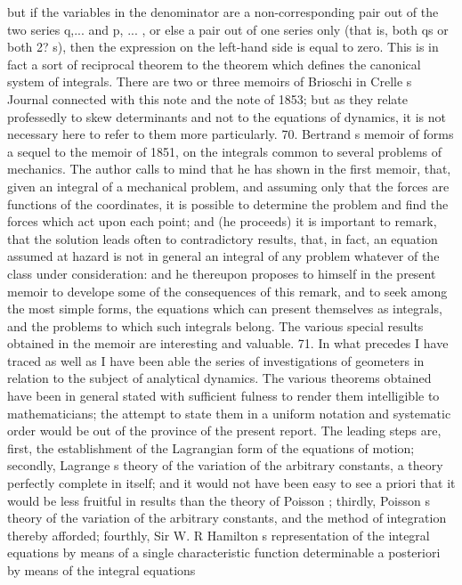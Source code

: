 \documentclass[11pt,a4paper]{book}
\begin{document}
but
if
the
variables
in
the
denominator
are
a
non-corresponding
pair
out
of
the two
series
q,... and
p,
...
,
or
else
a
pair
out
of one
series
only
(that
is,
both qs
or both
2? s), then
the
expression
on
the
left-hand
side
is
equal
to
zero.
This
is
in
fact a
sort
of
reciprocal theorem
to
the
theorem
which
defines
the
canonical
system
of
integrals.
There
are
two
or
three
memoirs
of
Brioschi
in
Crelle s
Journal
connected
with
this
note and
the
note
of
1853;
but
as
they
relate
professedly
to
skew
determinants
and
not
to
the
equations
of
dynamics,
it
is
not
necessary
here
to
refer
to
them
more
particularly.
70.
Bertrand s
memoir
of
forms
a
sequel
to
the
memoir
of
1851,
on
the
integrals common
to
several
problems
of
mechanics.
The
author
calls
to mind that he
has
shown
in
the
first
memoir,
that,
given
an
integral
of
a
mechanical
problem, and
assuming only that the
forces are
functions
of the
coordinates, it
is
possible
to determine
the
problem
and
find
the
forces which
act
upon
each
point;
and
(he
proceeds)
it
is
important
to
remark,
that
the
solution
leads
often
to
contradictory
results,
that,
in
fact,
an
equation
assumed
at
hazard
is
not
in
general
an
integral
of
any
problem
whatever
of
the
class
under
consideration:
and
he
thereupon
proposes
to
himself
in
the
present
memoir
to
develope
some
of
the
consequences
of
this
remark,
and
to
seek
among
the
most
simple
forms,
the
equations
which
can
present
themselves
as
integrals, and
the
problems to
which
such
integrals
belong.
The
various
special
results
obtained
in the memoir are interesting and valuable.
71.
In
what
precedes
I
have
traced
as
well
as
I
have
been
able
the
series
of
investigations
of
geometers
in
relation
to
the
subject
of
analytical
dynamics.
The
various theorems
obtained have
been
in
general
stated with
sufficient
fulness
to
render
them
intelligible
to mathematicians;
the attempt
to
state
them
in
a
uniform
notation
and
systematic
order would
be
out
of
the
province
of
the
present
report.
The leading
steps
are,
first, the establishment
of
the
Lagrangian form
of
the
equations
of
motion;
secondly, Lagrange s theory
of the
variation
of
the
arbitrary
constants, a theory perfectly
complete
in
itself;
and
it would
not
have
been
easy
to
see
a priori
that
it would be
less
fruitful
in
results
than
the
theory
of
Poisson
;
thirdly,
Poisson s
theory
of
the
variation
of
the
arbitrary
constants,
and
the
method
of
integration
thereby
afforded;
fourthly,
Sir W. R
Hamilton s
representation
of
the
integral
equations
by
means
of
a
single
characteristic
function
determinable
a
posteriori
by
means
of
the
integral
equations
\end{document}

